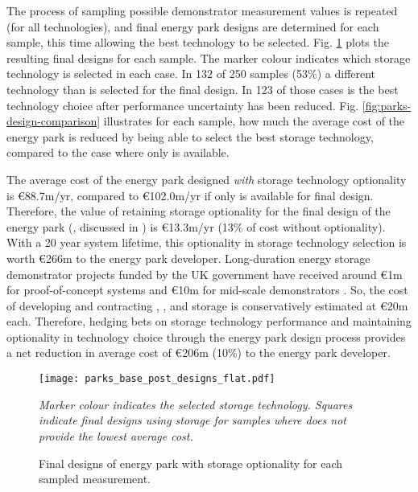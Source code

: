The process of sampling possible demonstrator measurement values is repeated (for all technologies), and final energy park designs are determined for each sample, this time allowing the best technology to be selected. Fig. \ref{fig:parks-open-designs} plots the resulting final designs for each sample. The marker colour indicates which storage technology is selected in each case. In 132 of 250 samples (53\%) a different technology than  is selected for the final design. In 123 of those cases  is the best technology choice after performance uncertainty has been reduced. Fig. \ref{fig:parks-design-comparison} illustrates for each sample, how much the average cost of the energy park is reduced by being able to select the best storage technology, compared to the case where only  is available.

The average cost of the energy park designed \textit{with} storage technology optionality is {\euro}88.7m/yr, compared to {\euro}102.0m/yr if only  is available for final design. Therefore, the value of retaining storage optionality for the final design of the energy park (, discussed in ) is {\euro}13.3m/yr (13\% of cost without optionality).
With a 20 year system lifetime, this optionality in storage technology selection is worth {\euro}266m to the energy park developer.
Long-duration energy storage demonstrator projects funded by the UK government have received around {\euro}1m for proof-of-concept systems \citep{desnz2023LongerDurationEnergy,hydrostorinc2023HydrostorWrittenEvidence} and {\euro}10m for mid-scale demonstrators \citep{desnz2023LongerDurationEnergya,desnz2023LongerDurationEnergyb}.
So, the cost of developing and contracting , , and  storage is conservatively estimated at {\euro}20m each.
Therefore, hedging bets on storage technology performance and maintaining optionality in technology choice through the energy park design process provides a net reduction in average cost of {\euro}206m (10\%) to the energy park developer.

\begin{figure}
    \centering
    \texttt{[image: parks\_base\_post\_designs\_flat.pdf]}
    \caption{Final designs of energy park with storage optionality for each sampled measurement.}
    \label{fig:parks-open-designs}
    \vspace*{0.1cm}
    \footnotesize{\it Marker colour indicates the selected storage technology. Squares indicate final designs using  storage for samples where  does not provide the lowest average cost.}
\end{figure}


